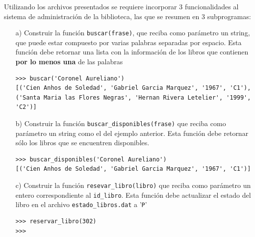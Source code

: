 Utilizando los archivos presentados se requiere incorporar 3 funcionalidades al sistema de administración de la biblioteca, las que se resumen en 3 subprogramas:

\begin{itemize}
    \item[a)] Construir la función \texttt{buscar(frase)}, que reciba como parámetro un string, que puede estar compuesto por varias palabras separadas por espacio. Esta función debe retornar una lista con la información de los libros que contienen \textbf{por lo menos una} de las palabras
    \begin{lstlisting}[style=consola]
>>> buscar('Coronel Aureliano')
[('Cien Anhos de Soledad', 'Gabriel Garcia Marquez', '1967', 'C1'), 
('Santa Maria las Flores Negras', 'Hernan Rivera Letelier', '1999', 'C2')]
    \end{lstlisting}
    
    \item[b)] Construir la función \texttt{buscar\_disponibles(frase)} que reciba como parámetro un string como el del ejemplo anterior. Esta función debe retornar sólo los libros que se encuentren disponibles.
    \begin{lstlisting}[style=consola]
>>> buscar_disponibles('Coronel Aureliano')
[('Cien Anhos de Soledad', 'Gabriel Garcia Marquez', '1967', 'C1')]    
    \end{lstlisting}
    
    \item[c)] Construir la función \texttt{resevar\_libro(libro)} que reciba como parámetro un entero correspondiente al \texttt{id\_libro}. Esta función debe actualizar el estado del libro en el archivo \texttt{estado\_libros.dat} a '\texttt{P}'
    \begin{lstlisting}[style=consola]
>>> reservar_libro(302)
>>> 
    \end{lstlisting}
\end{itemize}